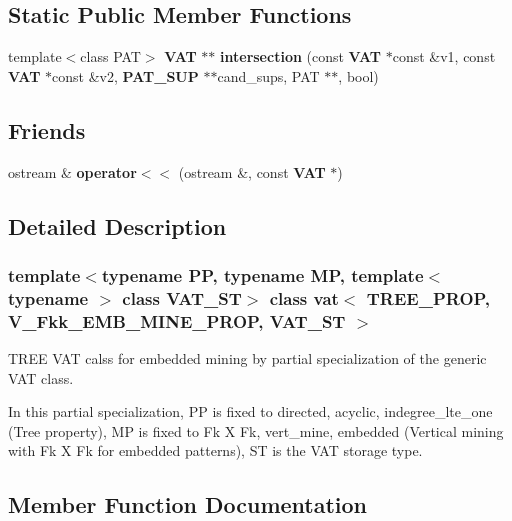 \subsection*{Static Public Member Functions}
\begin{CompactItemize}
\item 
template$<$class PAT$>$ {\bf VAT} $\ast$$\ast$ {\bf intersection} (const  {\bf VAT} $\ast$const \&v1, const  {\bf VAT} $\ast$const \&v2, {\bf PAT\_\-SUP} $\ast$$\ast$cand\_\-sups, PAT $\ast$$\ast$, bool)
\end{CompactItemize}
\subsection*{Friends}
\begin{CompactItemize}
\item 
ostream \& {\bf operator$<$$<$} (ostream \&, const  {\bf VAT} $\ast$)\label{classvat_3_01TREE__PROP_00_01V__Fkk__EMB__MINE__PROP_00_01VAT__ST_01_4_n0}

\end{CompactItemize}


\subsection{Detailed Description}
\subsubsection*{template$<$typename PP, typename MP, template$<$ typename $>$ class VAT\_\-ST$>$ class vat$<$ TREE\_\-PROP, V\_\-Fkk\_\-EMB\_\-MINE\_\-PROP, VAT\_\-ST $>$}

TREE VAT calss for embedded mining by partial specialization of the generic VAT class. 

In this partial specialization, PP is fixed to directed, acyclic, indegree\_\-lte\_\-one (Tree property), MP is fixed to Fk X Fk, vert\_\-mine, embedded (Vertical mining with Fk X Fk for embedded patterns), ST is the VAT storage type. 



\subsection{Member Function Documentation}
